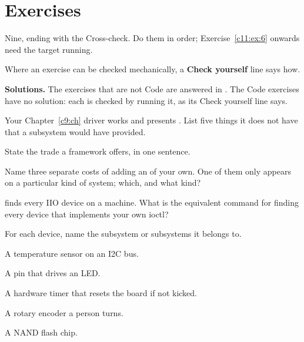 
\section{Exercises}
\label{c11:sec:exercises}\label{c11:app:b}

\begin{aside}
Nine, ending with the Cross-check. Do them in order; Exercise~\ref{c11:ex:6} onwards need the target
running.

Where an exercise can be checked mechanically, a \textbf{Check yourself} line says how.

\textbf{Solutions.} The exercises that are not Code are answered in . The Code
exercises have no solution: each is checked by running it, as its Check yourself line says.
\end{aside}

\label{c11:ex:1}

 Your Chapter~\ref{c9:ch} driver works and presents . List five things
it does not have that a subsystem would have provided.

 State the trade a framework offers, in one sentence.

 Name three separate costs of adding an  of your own. One of them only appears
on a particular kind of system; which, and what kind?

  finds every IIO device on a machine. What is the equivalent
command for finding every device that implements your own ioctl?

\label{c11:ex:2}

For each device, name the subsystem or subsystems it belongs to.

 A temperature sensor on an I2C bus.

 A pin that drives an LED.

 A hardware timer that resets the board if not kicked.

 A rotary encoder a person turns.

 A NAND flash chip.

